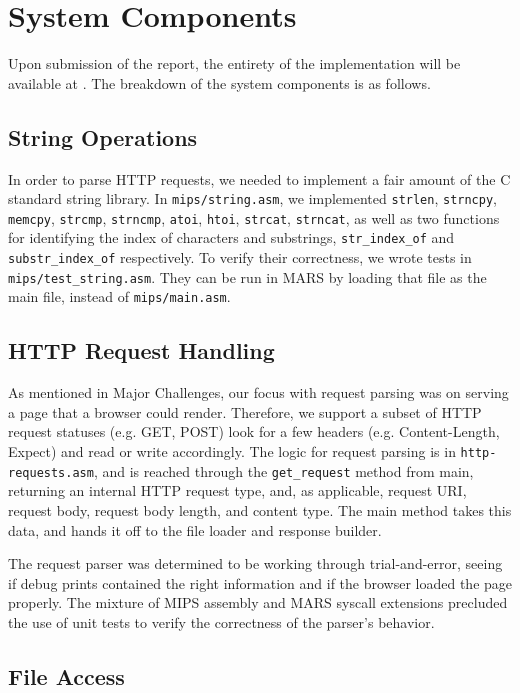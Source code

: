 \documentclass[journal,10pt]{IEEEtran}
\begin{document}
\section{System Components}

Upon submission of the report, the entirety of the implementation will be available at \cite{Brennan}. The breakdown of the system components is as follows.

\subsection{String Operations}

In order to parse HTTP requests, we needed to implement a fair amount of the C
standard string library.  In \texttt{mips/string.asm}, we implemented
\texttt{strlen}, \texttt{strncpy}, \texttt{memcpy}, \texttt{strcmp},
\texttt{strncmp}, \texttt{atoi}, \texttt{htoi}, \texttt{strcat},
\texttt{strncat}, as well as two functions for identifying the index of
characters and substrings, \texttt{str\_index\_of} and
\texttt{substr\_index\_of} respectively.  To verify their correctness, we wrote
tests in \texttt{mips/test\_string.asm}.  They can be run in MARS by loading
that file as the main file, instead of \texttt{mips/main.asm}.

\subsection{HTTP Request Handling}

As mentioned in Major Challenges, our focus with request parsing was on serving
a page that a browser could render. Therefore, we support a subset of HTTP
request statuses (e.g. GET, POST) look for a few headers (e.g. Content-Length,
Expect) and read or write accordingly. The logic for request parsing is in
\texttt{http-requests.asm}, and is reached through the \texttt{get\_request}
method from main, returning an internal HTTP request type, and, as applicable,
request URI, request body, request body length, and content type. The main
method takes this data, and hands it off to the file loader and response builder.

The request parser was determined to be working through trial-and-error, seeing
if debug prints contained the right information and if the browser loaded the
page properly. The mixture of MIPS assembly and MARS syscall extensions
precluded the use of unit tests to verify the correctness of the parser's
behavior.

\subsection{File Access}
\end{document}
